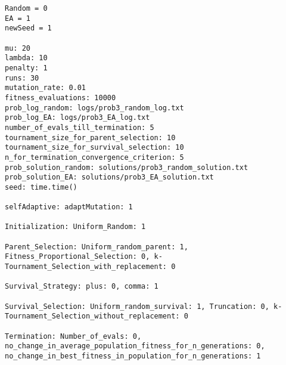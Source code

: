 \documentclass[•]{article}
\begin{document}
\begin{lstlisting}
Random = 0
EA = 1
newSeed = 1

mu: 20
lambda: 10
penalty: 1
runs: 30
mutation_rate: 0.01
fitness_evaluations: 10000
prob_log_random: logs/prob3_random_log.txt
prob_log_EA: logs/prob3_EA_log.txt
number_of_evals_till_termination: 5
tournament_size_for_parent_selection: 10
tournament_size_for_survival_selection: 10
n_for_termination_convergence_criterion: 5
prob_solution_random: solutions/prob3_random_solution.txt
prob_solution_EA: solutions/prob3_EA_solution.txt
seed: time.time()

selfAdaptive: adaptMutation: 1

Initialization: Uniform_Random: 1

Parent_Selection: Uniform_random_parent: 1, Fitness_Proportional_Selection: 0, k-Tournament_Selection_with_replacement: 0

Survival_Strategy: plus: 0, comma: 1

Survival_Selection: Uniform_random_survival: 1, Truncation: 0, k-Tournament_Selection_without_replacement: 0

Termination: Number_of_evals: 0, no_change_in_average_population_fitness_for_n_generations: 0, no_change_in_best_fitness_in_population_for_n_generations: 1
\end{lstlisting}
\end{document}
